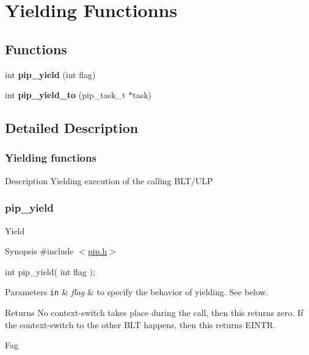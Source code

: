 \hypertarget{group__ulp-0-yield}{\section{Yielding Functionns}
\label{group__ulp-0-yield}
}
\subsection*{Functions}
\begin{DoxyCompactItemize}
\item 
\hypertarget{group__ulp-0-yield_ga50469f21446ce86ea18ddd282cf15894}{int {\bfseries pip\-\_\-yield} (int flag)}\label{group__ulp-0-yield_ga50469f21446ce86ea18ddd282cf15894}

\item 
\hypertarget{group__ulp-0-yield_gac30cf124b28a8d80dac34c5e1bdb66ba}{int {\bfseries pip\-\_\-yield\-\_\-to} (pip\-\_\-task\-\_\-t $\ast$task)}\label{group__ulp-0-yield_gac30cf124b28a8d80dac34c5e1bdb66ba}

\end{DoxyCompactItemize}


\subsection{Detailed Description}
\hypertarget{pip-yield}{}\subsubsection{Yielding functions}\label{pip-yield}
\begin{DoxyParagraph}{Description}
Yielding execution of the calling B\-L\-T/\-U\-L\-P 
\end{DoxyParagraph}
\hypertarget{pip_yield}{}\subsubsection{pip\-\_\-yield}\label{pip_yield}
Yield

\begin{DoxyParagraph}{Synopsis}
\#include $<$\hyperlink{pip_8h_source}{pip.\-h}$>$ \par
int pip\-\_\-yield( int flag );
\end{DoxyParagraph}

\begin{DoxyParams}[1]{Parameters}
\mbox{\tt in}  & {\em flag} & to specify the behavior of yielding. See below.\\
\hline
\end{DoxyParams}
\begin{DoxyReturn}{Returns}
No context-\/switch takes place during the call, then this returns zero. If the context-\/switch to the other B\-L\-T happens, then this returns {\ttfamily E\-I\-N\-T\-R}.
\end{DoxyReturn}
\begin{DoxyParagraph}{Fag}

\end{DoxyParagraph}

